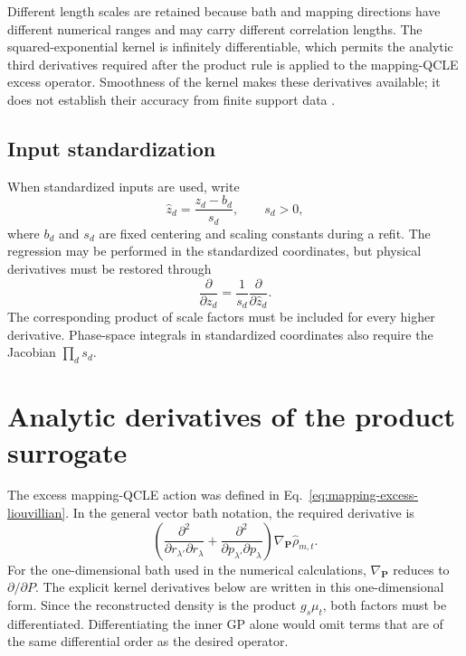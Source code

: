 \documentclass[
  11pt,
  letterpaper,
  onehalfspacing,
  normalmargins,
  equalmargins,
  oneside
]{ut-thesis}
\begin{document}
Different length scales are retained because bath and mapping directions have
different numerical ranges and may carry different correlation lengths. The
squared-exponential kernel is infinitely differentiable, which permits the
analytic third derivatives required after the product rule is applied to the
mapping-QCLE excess operator. Smoothness of the kernel makes these derivatives
available; it does not establish their accuracy from finite support data
\cite{Solak2002DerivativeGP,Raissi2017LinearGP,Raissi2018NumericalGP,Wendland2005,SchabackWendland2006}.


\subsection{Input standardization}
\label{subsec:input-scaling-anisotropy}

When standardized inputs are used, write
\begin{equation}
\widehat z_d
=
\frac{z_d-b_d}{s_d},
\qquad
s_d>0,
\label{eq:gp-standardized-input}
\end{equation}
where \(b_d\) and \(s_d\) are fixed centering and scaling constants during a
refit. The regression may be performed in the standardized coordinates, but
physical derivatives must be restored through
\begin{equation}
\frac{\partial}{\partial z_d}
=
\frac{1}{s_d}
\frac{\partial}{\partial\widehat z_d}.
\label{eq:gp-standardization-first-derivative}
\end{equation}
The corresponding product of scale factors must be included for every higher
derivative. Phase-space integrals in standardized coordinates also require the
Jacobian \(\prod_d s_d\).


\section{Analytic derivatives of the product surrogate}
\label{sec:analytic-derivatives-gp-surrogate}

The excess mapping-QCLE action was defined in
Eq.~\eqref{eq:mapping-excess-liouvillian}. In the general vector bath notation, the required derivative is
\begin{equation}
\left(
\frac{\partial^2}{\partial r_{\lambda'}\partial r_\lambda}
+
\frac{\partial^2}{\partial p_{\lambda'}\partial p_\lambda}
\right)
\nabla_{\mathbf P}
\widehat{\rho}_{m,t}.
\label{eq:gp-required-excess-derivative}
\end{equation}
For the one-dimensional bath used in the numerical calculations,
\(\nabla_{\mathbf P}\) reduces to \(\partial/\partial P\). The explicit
kernel derivatives below are written in this one-dimensional form.
Since the reconstructed density is the product \(g_s\mu_t\), both factors
must be differentiated. Differentiating the inner GP alone would omit terms
that are of the same differential order as the desired operator.
\end{document}
